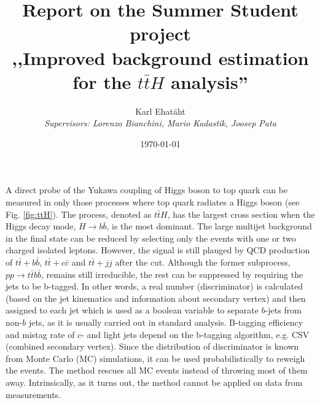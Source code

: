 \documentclass[12pt,a4paper]{article}
\title{\TitleFont\textbf{Report on the Summer Student project\\,,Improved background estimation for the $t\bar{t}H$ analysis''}}
\author{Karl Ehatäht\\[0.5em]
\textit{Supervisors: Lorenzo Bianchini, Mario Kadastik, Joosep Pata}}
\date\today
\begin{document}
\maketitle

A direct probe of the Yukawa coupling of Higgs boson to top quark can be measured in only those processes where top quark radiates a Higgs boson (see Fig. \ref{fig:ttH}).
The process, denoted as $t\bar{t}H$, has the largest cross section when the Higgs decay mode, $H \to b\bar{b}$, is the most dominant.
The large multijet background in the final state  can be reduced by selecting only the events with one or two charged isolated leptons.
However, the signal is still plauged by QCD production of $t\bar{t}+b\bar{b}$, $t\bar{t}+c\bar{c}$ and $t\bar{t}+jj$ after the cut.
Although the former subprocess, $pp\to t\bar{t}b\bar{b}$, remains still irreducible, the rest can be suppressed by requiring the jets to be b-tagged.
In other words, a real number (discriminator) is calculated (based on the jet kinematics and information about secondary vertex) and then assigned to each jet which is used as a boolean variable to separate $b$-jets from non-$b$ jets, as it is usually carried out in standard analysis.
B-tagging efficiency and mistag rate of $c$- and light jets depend on the b-tagging algorithm, e.g. CSV (combined secondary vertex).
Since the distribution of discriminator is known from Monte Carlo (MC) simulations, it can be used probabilistically to reweigh the events.
The method rescues all MC events instead of throwing most of them away.
Intrinsically, as it turns out, the method cannot be applied on data from measurements.
\vspace*{1em}
\end{document}
